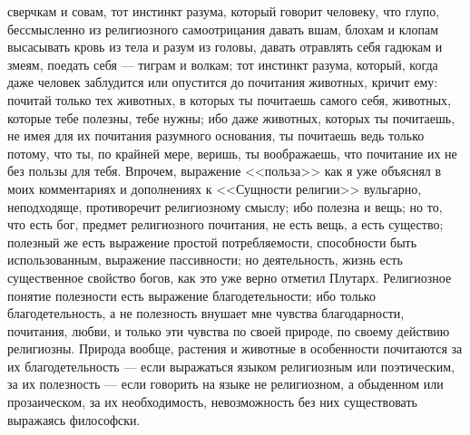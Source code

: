 \documentclass[12pt]{article}
\begin{document}
сверчкам и совам, тот инстинкт разума, который говорит человеку, что глупо, бессмысленно из религиозного самоотрицания давать вшам, блохам и клопам высасывать кровь из тела и разум из головы, давать отравлять себя гадюкам и змеям, поедать себя --- тиграм и волкам; тот инстинкт разума, который, когда даже человек заблудится или опустится до почитания животных, кричит ему: почитай только тех животных, в которых ты почитаешь самого себя, животных, которые тебе полезны, тебе нужны; ибо даже животных, которых ты почитаешь, не имея для их почитания разумного основания, ты почитаешь ведь только потому, что ты, по крайней мере, веришь, ты воображаешь, что почитание их не без пользы для тебя. Впрочем, выражение <<польза>> как я уже объяснял в моих комментариях и дополнениях к <<Сущности религии>>  вульгарно, неподходяще, противоречит религиозному смыслу; ибо полезна и вещь; но то, что есть бог, предмет религиозного почитания, не есть вещь, а есть существо; полезный же есть выражение простой потребляемости, способности быть использованным, выражение пассивности; но деятельность, жизнь есть существенное свойство богов, как это уже верно отметил Плутарх. Религиозное понятие полезности есть выражение благодетельности; ибо только благодетельность, а не полезность внушает мне чувства благодарности, почитания, любви, и только эти чувства по своей природе, по своему действию религиозны. Природа вообще, растения и животные в особенности почитаются за их благодетельность --- если выражаться языком религиозным или поэтическим, за их полезность --- если говорить на языке не религиозном, а обыденном или прозаическом, за их необходимость, невозможность без них существовать выражаясь философски. 
\end{document}
